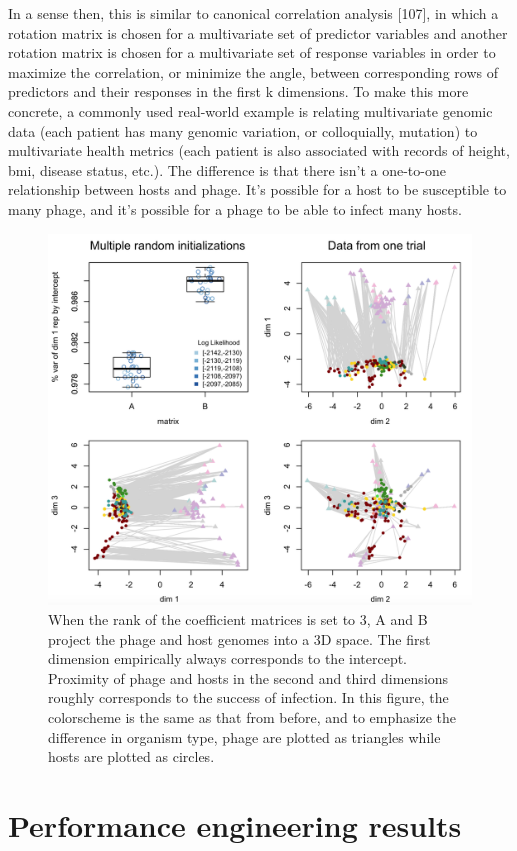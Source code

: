 \documentclass[12pt,twoside]{mitthesis-manusdown}
\begin{document}
In a sense then, this is similar to canonical correlation analysis
{[}107{]}, in which a rotation matrix is chosen for a multivariate set
of predictor variables and another rotation matrix is chosen for a
multivariate set of response variables in order to maximize the
correlation, or minimize the angle, between corresponding rows of
predictors and their responses in the first k dimensions. To make this
more concrete, a commonly used real-world example is relating
multivariate genomic data (each patient has many genomic variation, or
colloquially, mutation) to multivariate health metrics (each patient is
also associated with records of height, bmi, disease status, etc.). The
difference is that there isn't a one-to-one relationship between hosts
and phage. It's possible for a host to be susceptible to many phage, and
it's possible for a phage to be able to infect many hosts.
\begin{figure}[tb!]

{\centering \includegraphics[width=0.8\linewidth]{figurespred/figGeom} 

}

\caption{\label{fig:figGeom}When the rank of the coefficient matrices is set to 3, A and B project the phage and host genomes into a 3D space. The first dimension empirically always corresponds to the intercept. Proximity of phage and hosts in the second and third dimensions roughly corresponds to the success of infection. In this figure, the colorscheme is the same as that from before, and to emphasize the difference in organism type, phage are plotted as triangles while hosts are plotted as circles.}\label{fig:figGeom}
\end{figure}
\section{Performance engineering
results}\label{performance-engineering-results}
\end{document}
